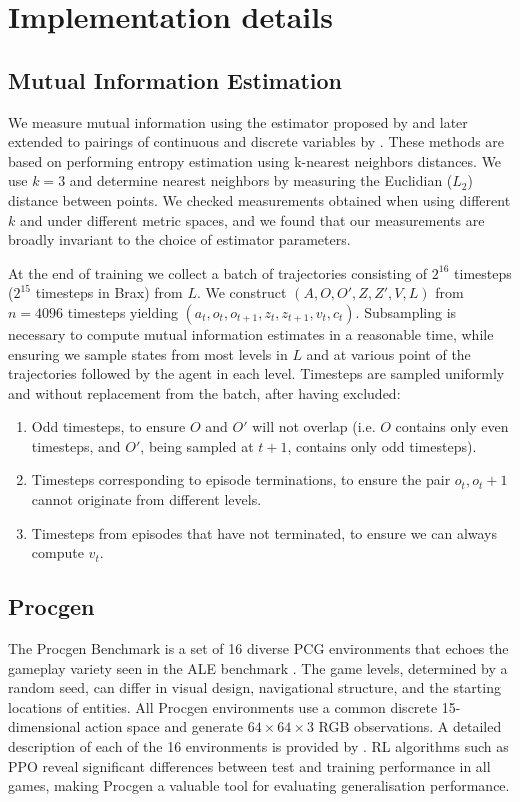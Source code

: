 \newpage
\clearpage
\section{Implementation details}

\subsection{Mutual Information Estimation}
We measure mutual information using the estimator proposed by \citet{kraskov2004estimating} and later extended to pairings of continuous and discrete variables by \citet{ross2014mutual}. These methods are based on performing entropy estimation using k-nearest neighbors distances. We use $k=3$ and determine nearest neighbors by measuring the Euclidian ($L_2$) distance between points. We checked measurements obtained when using different $k$ and under different metric spaces, and we found that our measurements are broadly invariant to the choice of estimator parameters.

At the end of training we collect a batch of trajectories consisting of $2^{16}$ timesteps ($2^{15}$ timesteps in Brax) from $L$. We construct $( A,O,O',Z,Z',V, L )$ from $n=4096$ timesteps yielding $( a_t, o_t, o_{t+1}, z_t, z_{t+1}, v_t, c_t)$. Subsampling is necessary to compute mutual information estimates in a reasonable time, while ensuring we sample states from most levels in $L$ and at various point of the trajectories followed by the agent in each level. Timesteps are sampled uniformly and without replacement from the batch, after having excluded:
\begin{enumerate}
    \item Odd timesteps, to ensure $O$ and $O'$ will not overlap (i.e. $O$ contains only even timesteps, and $O'$, being sampled at $t+1$, contains only odd timesteps).
    \item Timesteps corresponding to episode terminations, to ensure the pair $o_t,o_t+1$ cannot originate from different levels.
    \item Timesteps from episodes that have not terminated, to ensure we can always compute $v_t$.
\end{enumerate}

\subsection{Procgen}\label{c2:app:results_procgen}
The Procgen Benchmark is a set of 16 diverse PCG environments that echoes the gameplay variety seen in the ALE benchmark \citep{ALE}. The game levels, determined by a random seed, can differ in visual design, navigational structure, and the starting locations of entities. All Procgen environments use a common discrete 15-dimensional action space and generate $64 \times 64 \times 3$ RGB observations. A detailed description of each of the 16 environments is provided by \citet{procgen}. RL algorithms such as PPO reveal significant differences between test and training performance in all games, making Procgen a valuable tool for evaluating generalisation performance.

